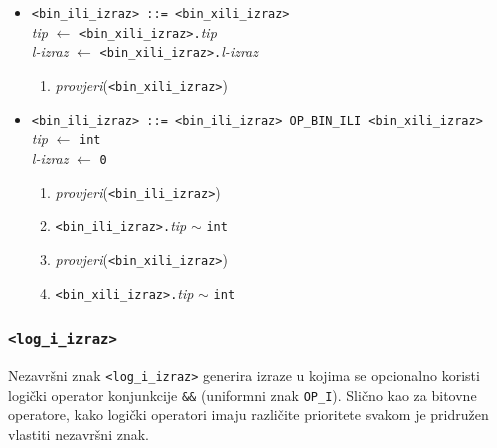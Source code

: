 \documentclass[times, 12pt, utf8]{book}
\begin{document}
\begin{itemize}

\item
\verb|<bin_ili_izraz> ::= <bin_xili_izraz>|\\
\emph{tip} \(\leftarrow\) \verb|<bin_xili_izraz>.|\emph{tip}\\
\emph{l-izraz} \(\leftarrow\) \verb|<bin_xili_izraz>.|\emph{l-izraz}
\begin{enumerate}
\item
\emph{provjeri}(\verb|<bin_xili_izraz>|)
\end{enumerate}

\item
\verb#<bin_ili_izraz> ::= <bin_ili_izraz> OP_BIN_ILI <bin_xili_izraz>#\\
\emph{tip} \(\leftarrow\) \verb|int|\\
\emph{l-izraz} \(\leftarrow\) \verb|0|
\begin{enumerate}
\item
\emph{provjeri}(\verb|<bin_ili_izraz>|)
\item
\verb|<bin_ili_izraz>.|\emph{tip} \(\sim\) \verb|int|
\item
\emph{provjeri}(\verb|<bin_xili_izraz>|)
\item
\verb|<bin_xili_izraz>.|\emph{tip} \(\sim\) \verb|int|
\end{enumerate}

\end{itemize}

\subsubsection{\texttt{<log\_i\_izraz>}}

Nezavršni znak \verb|<log_i_izraz>| generira izraze u kojima se opcionalno koristi logički operator konjunkcije \verb|&&| (uniformni znak \verb|OP_I|).
Slično kao za bitovne operatore, kako logički operatori imaju različite prioritete svakom je pridružen vlastiti nezavršni znak.
\end{document}
